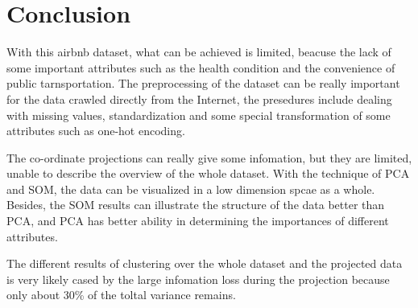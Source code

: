 \documentclass[12pt]{article}
\begin{document}
\section{Conclusion}
With this airbnb dataset, what can be achieved is limited, beacuse the lack of some important attributes such as the health condition and the convenience of public tarnsportation. The preprocessing of the dataset can be really important for the data crawled directly from the Internet, the presedures include dealing with missing values, standardization and some special transformation of some attributes such as one-hot encoding. \par 
The co-ordinate projections can really give some infomation, but they are limited, unable to describe the overview of the whole dataset. With the technique of PCA and SOM, the data can be visualized in a low dimension spcae as a whole. Besides, the SOM results can illustrate the structure of the data better than PCA, and PCA has better ability in determining the importances of different attributes.
\par The different results of clustering over the whole dataset and the projected data is very likely cased by the large infomation loss during the projection because only about 30\% of the toltal variance remains.

\end{document}
